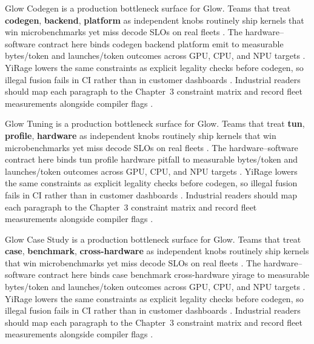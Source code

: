 Glow Codegen is a production bottleneck surface for Glow. Teams that treat \textbf{codegen}, \textbf{backend}, \textbf{platform} as independent knobs routinely ship kernels that win microbenchmarks yet miss decode SLOs on real fleets \citep{semianalysis2024tma,dlbook}. The hardware--software contract here binds codegen backend platform emit to measurable bytes/token and launches/token outcomes across GPU, CPU, and NPU targets \citep{amd2024xdna,dao2022flashattention}. YiRage lowers the same constraints as explicit legality checks before codegen, so illegal fusion fails in CI rather than in customer dashboards \citep{amd2024aie,kwon2023vllm}. Industrial readers should map each paragraph to the Chapter~3 constraint matrix and record fleet measurements alongside compiler flags \citep{dlbook,nvidia2024cudagraphs}.

Glow Tuning is a production bottleneck surface for Glow. Teams that treat \textbf{tun}, \textbf{profile}, \textbf{hardware} as independent knobs routinely ship kernels that win microbenchmarks yet miss decode SLOs on real fleets \citep{amd2024xdna,dao2022flashattention}. The hardware--software contract here binds tun profile hardware pitfall to measurable bytes/token and launches/token outcomes across GPU, CPU, and NPU targets \citep{amd2024aie,kwon2023vllm}. YiRage lowers the same constraints as explicit legality checks before codegen, so illegal fusion fails in CI rather than in customer dashboards \citep{dlbook,nvidia2024cudagraphs}. Industrial readers should map each paragraph to the Chapter~3 constraint matrix and record fleet measurements alongside compiler flags \citep{dao2022flashattention,liu2024deepseekv3}.

Glow Case Study is a production bottleneck surface for Glow. Teams that treat \textbf{case}, \textbf{benchmark}, \textbf{cross-hardware} as independent knobs routinely ship kernels that win microbenchmarks yet miss decode SLOs on real fleets \citep{amd2024aie,kwon2023vllm}. The hardware--software contract here binds case benchmark cross-hardware yirage to measurable bytes/token and launches/token outcomes across GPU, CPU, and NPU targets \citep{dlbook,nvidia2024cudagraphs}. YiRage lowers the same constraints as explicit legality checks before codegen, so illegal fusion fails in CI rather than in customer dashboards \citep{dao2022flashattention,liu2024deepseekv3}. Industrial readers should map each paragraph to the Chapter~3 constraint matrix and record fleet measurements alongside compiler flags \citep{kwon2023vllm,patel2025llminference}.


